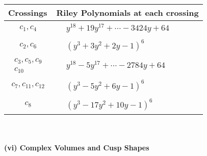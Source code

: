 \documentclass[1p]{elsarticle_modified}
\theoremstyle{definition}
\begin{document}
\begin{tabular}{m{50pt}|m{274pt}}
Crossings & \hspace{64pt}Riley Polynomials at each crossing \\
\hline $$\begin{aligned}c_{1},c_{4}\end{aligned}$$&$\begin{aligned}
&y^{18}+19 y^{17}+\cdots-3424 y+64
\end{aligned}$\\
\hline $$\begin{aligned}c_{2},c_{6}\end{aligned}$$&$\begin{aligned}
&(y^3+3 y^2+2 y-1)^6
\end{aligned}$\\
\hline $$\begin{aligned}c_{3},c_{5},c_{9}\\c_{10}\end{aligned}$$&$\begin{aligned}
&y^{18}-5 y^{17}+\cdots-2784 y+64
\end{aligned}$\\
\hline $$\begin{aligned}c_{7},c_{11},c_{12}\end{aligned}$$&$\begin{aligned}
&(y^3-5 y^2+6 y-1)^6
\end{aligned}$\\
\hline $$\begin{aligned}c_{8}\end{aligned}$$&$\begin{aligned}
&(y^3-17 y^2+10 y-1)^6
\end{aligned}$\\
\hline
\end{tabular}\\~\\
\newpage\flushleft \textbf{(vi) Complex Volumes and Cusp Shapes}
\end{document}
